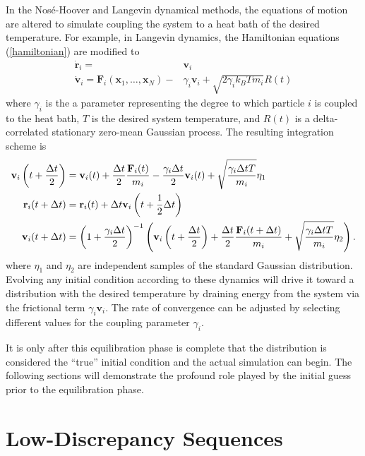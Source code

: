 \documentclass{article}
\begin{document}
In the Nos\'e-Hoover and Langevin dynamical methods, the equations of motion are altered to simulate coupling the system to a heat bath of the desired temperature. For example, in Langevin dynamics, the Hamiltonian equations (\ref{hamiltonian}) are modified to
\begin{equation}
\begin{split}
\dot{\mathbf{r}}_i=&\mathbf{v}_i\\
\dot{\mathbf{v}}_i=\mathbf{F}_i(\mathbf{x}_1,\dots,\mathbf{x}_N)-&\gamma_i \mathbf{v}_i+\sqrt{2\gamma_i k_BTm_i}R(t)
\end{split}\label{langevin}
\end{equation}where $\gamma_i$ is the a parameter representing the degree to which particle $i$ is coupled to the heat bath, $T$ is the desired system temperature, and $R(t)$ is a delta-correlated stationary zero-mean Gaussian process. The resulting integration scheme is
\begin{align}
\mathbf{v}_i\left(t+\frac{\Delta t}{2}\right) &= \mathbf{v}_i(t) + \frac{\Delta t}{2}\frac{\mathbf{F}_i(t)}{m_i} - \frac{\gamma_i\Delta t}{2}\mathbf{v}_i(t) + \sqrt{\frac{\gamma_i \Delta tT}{m_i}}\eta_1 \notag\\
\mathbf{r}_i(t+\Delta t) &= \mathbf{r}_i(t) + \Delta t\mathbf{v}_i\left(t+\frac{1}{2}\Delta t\right) \label{langevinverlet}\\
\mathbf{v}_i(t+\Delta t) &= \left(1 + \frac{\gamma_i\Delta t}{2}\right)^{-1} \left(\mathbf{v}_i\left(t+\frac{\Delta t}{2}\right) +  \frac{\Delta t}{2}\frac{\mathbf{F}_i(t+\Delta t)}{m_i} + \sqrt{\frac{\gamma_i \Delta tT}{m_i}}\eta_2\right).\notag
\end{align}where $\eta_1$ and $\eta_2$ are independent samples of the standard Gaussian distribution. Evolving any initial condition according to these dynamics will drive it toward a distribution with the desired temperature by draining energy from the system via the frictional term $\gamma_i\mathbf{v}_i$. The rate of convergence can be adjusted by selecting different values for the coupling parameter $\gamma_i$.

It is only after this equilibration phase is complete that the distribution is considered the ``true'' initial condition and the actual simulation can begin. The following sections will demonstrate the profound role played by the initial guess prior to the equilibration phase.

\section{Low-Discrepancy Sequences}
\end{document}

